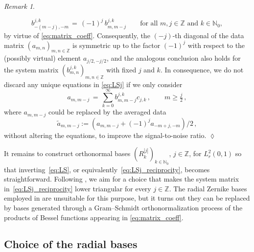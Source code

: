 \documentclass[11pt,a4paper]{article}
\theoremstyle{definition}
\theoremstyle{remark} \newtheorem{remark}[theorem]{Remark}
\numberwithin{equation}{section}
\numberwithin{figure}{section}
\numberwithin{algorithm}{section}
\numberwithin{table}{section}
\newcommand{\field}[1]{{\mathbb{#1}}}
\newcommand{\N}{\field{N}}
\newcommand{\Z}{\field{Z}}
\begin{document}
\begin{remark}
\begin{enumerate}
\begin{equation*}
            b^{j,k}_{-(m-j),-m} \,=\, (-1)^j\,b^{j,k}_{m,m-j} \qquad \text{for all }m, j \in\Z \text{ and }  k \in \N_0,
        \end{equation*}
        by virtue of \eqref{eq:matrix_coeff}.
        Consequently, the $(-j)$-th diagonal of the data matrix $(a_{m,n})_{m,n\in\Z}$ is symmetric up to the factor $(-1)^j$ with respect to the (possibly virtual) element $a_{j/2,-j/2}$, and the analogous conclusion also holds for the system matrix $(b_{m,n}^{j,k})_{m,n \in \Z}$ with fixed $j$ and $k$.
        In consequence, we do not discard any unique equations in \eqref{eq:LSj} if we only consider 
        \begin{equation}
        \label{eq:LSj_reciprocity}
            a_{m,m-j}
            \,=\, \sum_{k=0}^\infty b_{m,m-j}^{j,k} c_{j,k}\,,
            \qquad  m\geq \tfrac j 2\,,
        \end{equation}
         where $a_{m,m-j}$ could be replaced by the averaged data 
         \begin{equation}
         \label{eq:noise_filt}
         \widetilde a_{m,m-j}:=(a_{m,m-j}+(-1)^ja_{-m+j,-m})/2\,,
         \end{equation}
         without altering the equations, to improve the signal-to-noise ratio.
    \hfill$\lozenge$
    \end{enumerate}
\end{remark}

It remains to construct orthonormal bases $(R_k^{|j|})_{k\in\N_0}$, $j \in \Z$, for $L^2_r(0,1)$ so that  inverting~\eqref{eq:LS}, or equivalently~\eqref{eq:LSj_reciprocity}, becomes  straightforward.
Following \cite{AutGarHirHvy24, GarHyv24}, we aim for a choice that makes the system matrix in~\eqref{eq:LSj_reciprocity} lower triangular for every $j \in \Z$. The radial Zernike bases employed in \cite{AutGarHirHvy24, GarHyv24} are unsuitable for this purpose, but it turns out they can be replaced by bases generated through a Gram--Schmidt orthonormalization process of the products of Bessel functions appearing in \eqref{eq:matrix_coeff}.

\subsection{Choice of the radial bases}
\label{subsec:RadialBasis}
\end{document}
